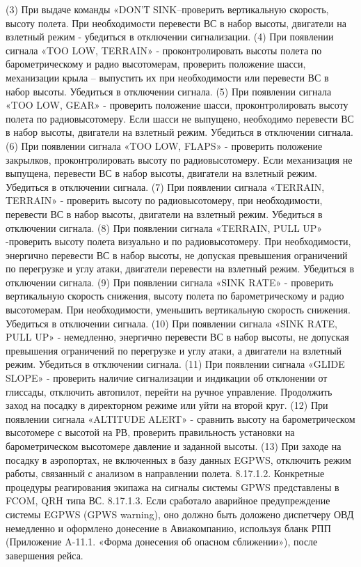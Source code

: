 (3) При выдаче команды «DON'Т SINK–проверить вертикальную скорость, высоту полета. При необходимости перевести ВС в набор высоты, двигатели на взлетный режим - убедиться в отключении сигнализации.
(4) При появлении сигнала «TOO LOW, TERRAIN» - проконтролировать высоты полета по барометрическому и радио высотомерам, проверить положение шасси, механизации крыла – выпустить их при необходимости или перевести ВС в набор высоты. Убедиться в отключении сигнала.
(5) При появлении сигнала «TOO LOW, GEAR» - проверить положение шасси, проконтролировать высоту полета по радиовысотомеру. Если шасси не выпущено, необходимо перевести ВС в набор высоты, двигатели на взлетный режим. Убедиться в отключении сигнала.
(6) При появлении сигнала «TOO LOW, FLAPS» - проверить положение закрылков, проконтролировать высоту по радиовысотомеру. Если механизация не выпущена, перевести ВС в набор высоты, двигатели на взлетный режим. Убедиться в отключении сигнала.
(7) При появлении сигнала «TERRAIN, TERRAIN» - проверить высоту по радиовысотомеру, при необходимости, перевести ВС в набор высоты, двигатели на взлетный режим. Убедиться в отключении сигнала.
(8) При появлении сигнала «TERRAIN, PULL UP» -проверить высоту полета визуально и по радиовысотомеру.
При необходимости, энергично перевести ВС в набор высоты, не допуская превышения ограничений по перегрузке и углу атаки, двигатели перевести на взлетный режим. Убедиться в отключении сигнала.
(9) При появлении сигнала «SINK RATE» - проверить вертикальную скорость снижения, высоту полета по барометрическому и радио высотомерам. При необходимости, уменьшить вертикальную скорость снижения. Убедиться в отключении сигнала.
(10) При появлении сигнала «SINK RATE, PULL UP» - немедленно, энергично перевести ВС в набор высоты, не допуская превышения ограничений по перегрузке и углу атаки, а двигатели на взлетный режим. Убедиться в отключении сигнала.
(11) При появлении сигнала «GLIDE SLOPE» - проверить наличие сигнализации и индикации об отклонении от глиссады, отключить автопилот, перейти на ручное управление. Продолжить заход на посадку в директорном режиме или уйти на второй круг.
(12) При появлении сигнала «ALTITUDE ALERT» - сравнить высоту на барометрическом высотомере с высотой на РВ, проверить правильность установки на барометрическом высотомере давление и заданной высоты.
(13) При заходе на посадку в аэропортах, не включенных в базу данных EGPWS, отключить режим работы, связанный с анализом в направлении полета.
8.17.1.2. Конкретные процедуры реагирования экипажа на сигналы системы GPWS представлены в FCOM, QRH типа ВС.
8.17.1.3. Если сработало аварийное предупреждение системы EGPWS (GPWS warning), оно должно быть доложено диспетчеру ОВД немедленно и оформлено донесение в Авиакомпанию, используя бланк РПП (Приложение A-11.1. «Форма донесения об опасном сближении»), после завершения рейса.

